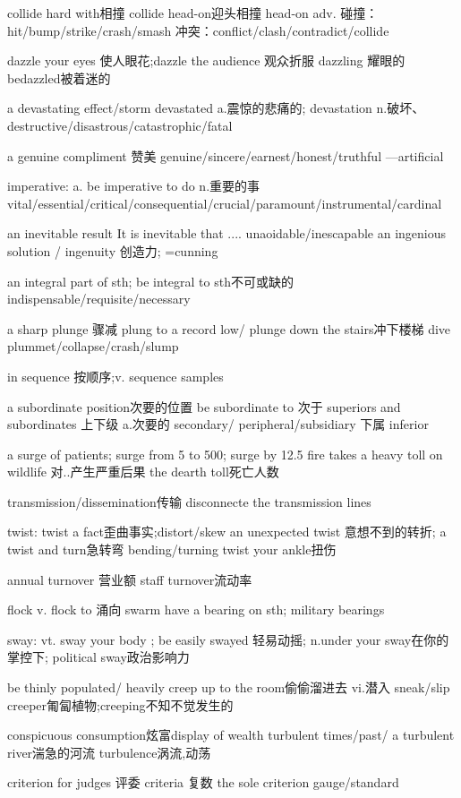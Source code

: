 \documentclass[a4paper,12pt]{article}
\begin{document}
collide hard with相撞 collide head-on迎头相撞  head-on adv.
碰撞：hit/bump/strike/crash/smash
冲突：conflict/clash/contradict/collide

dazzle your eyes 使人眼花;dazzle the audience 观众折服 dazzling 耀眼的
bedazzled被着迷的

a devastating effect/storm
devastated a.震惊的悲痛的; devastation n.破坏、
destructive/disastrous/catastrophic/fatal

a genuine compliment 赞美
  genuine/sincere/earnest/honest/truthful   ---artificial 

imperative: a. be imperative to do 
n.重要的事
vital/essential/critical/consequential/crucial/paramount/instrumental/cardinal

an inevitable result
It is inevitable that ....
unaoidable/inescapable
an ingenious solution /   ingenuity 创造力;
=cunning

an integral part of sth;  be integral to sth不可或缺的
indispensable/requisite/necessary

a sharp plunge 骤减 plung to a record low/ plunge down the stairs冲下楼梯 dive
plummet/collapse/crash/slump

in sequence 按顺序;v. sequence samples 

a subordinate position次要的位置 be subordinate to 次于 superiors and subordinates 上下级
a.次要的 secondary/ peripheral/subsidiary 
  下属 inferior

a surge of patients; surge from 5 to 500; surge by 12.5%
fire takes a heavy toll on wildlife 对..产生严重后果
the dearth toll死亡人数

transmission/dissemination传输 disconnecte the transmission lines 

twist: twist a fact歪曲事实;distort/skew
an unexpected twist 意想不到的转折; a twist and turn急转弯 bending/turning 
twist your ankle扭伤

annual turnover 营业额 staff turnover流动率

flock v. flock to 涌向 swarm
have a bearing on sth; military bearings 

sway: vt. sway your body ; be easily swayed 轻易动摇;
n.under your sway在你的掌控下; political sway政治影响力

be thinly populated/ heavily 
creep up to the room偷偷溜进去 vi.潜入 sneak/slip
creeper匍匐植物;creeping不知不觉发生的

conspicuous consumption炫富display of wealth
turbulent times/past/  a turbulent river湍急的河流 turbulence涡流,动荡

criterion for judges 评委  criteria 复数 the sole criterion
gauge/standard
\end{document}
